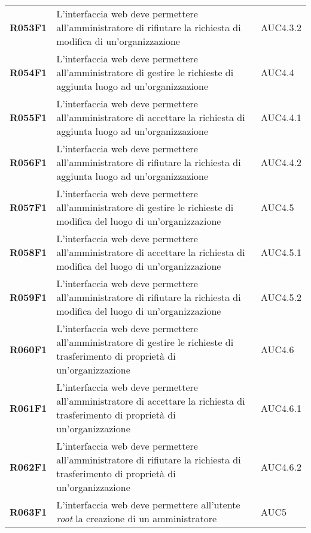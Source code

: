 \documentclass[../analisi-dei-requisiti.tex]{subfiles}
\begin{document}
\begin{longtable}[H]{>{\centering\bfseries}m{3cm} >{\centering}m{10cm} >{\centering\arraybackslash}m{3cm}}
  R053F1                  & L'interfaccia web deve permettere all'amministratore di rifiutare la richiesta di modifica di un'organizzazione                                & AUC4.3.2                      \\
  R054F1                  & L'interfaccia web deve permettere all'amministratore di gestire le richieste di aggiunta luogo ad un'organizzazione                            & AUC4.4                        \\
  R055F1                  & L'interfaccia web deve permettere all'amministratore di accettare la richiesta di aggiunta luogo ad un'organizzazione                          & AUC4.4.1                      \\
  R056F1                  & L'interfaccia web deve permettere all'amministratore di rifiutare la richiesta di aggiunta luogo ad un'organizzazione                          & AUC4.4.2                      \\
  R057F1                  & L'interfaccia web deve permettere all'amministratore di gestire le richieste di modifica del luogo di un'organizzazione                        & AUC4.5                        \\
  R058F1                  & L'interfaccia web deve permettere all'amministratore di accettare la richiesta di modifica del luogo di un'organizzazione                      & AUC4.5.1                      \\
  R059F1                  & L'interfaccia web deve permettere all'amministratore di rifiutare la richiesta di modifica del luogo di un'organizzazione                      & AUC4.5.2                      \\
  R060F1                  & L'interfaccia web deve permettere all'amministratore di gestire le richieste di trasferimento di proprietà di un'organizzazione                & AUC4.6                        \\
  R061F1                  & L'interfaccia web deve permettere all'amministratore di accettare la richiesta di trasferimento di proprietà di un'organizzazione              & AUC4.6.1                      \\
  R062F1                  & L'interfaccia web deve permettere all'amministratore di rifiutare la richiesta di trasferimento di proprietà di un'organizzazione              & AUC4.6.2                      \\
  R063F1                  & L'interfaccia web deve permettere all'utente \textit{root} la creazione di un amministratore                                                   & AUC5                          \\

\end{longtable}
\end{document}
